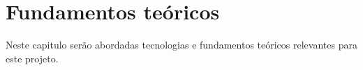 \chapter{Fundamentos teóricos}
\label{chap:theo}


Neste capitulo serão abordadas tecnologias e fundamentos teóricos relevantes para 
este projeto. \\


\begin{comment}

\section{Distribuições Linux}

Sendo Linux apenas um \textit{Kernel}, ou seja, um "nucleo" de um sistema operativo
o mesmo não pode ser usado si só da mesma forma que outros sistemas operativos.
Para ter um sistema completo é necessário adicionar multiplos programas/bibliotecas,
sendo assim, existe um numero elevado de sistemas operativos basedos em Linux.

Certas distribuições podem ter diferentes alvos de utilizadores/utilização, quer seja,
para uso pessoal/tradicional de um utilizar comum, quer seja para servidores.

As principais vantagens associadas ao uso de um Sistema operativo baseado em Linux são:
\begin{enumerate}
    \item Não é preciso licensa de utilização;
    \item Código aberto;
    \item É um sistema que por norma consome menos recursos que a maioria das distribuições disponiveis;
    \item costumização.
\end{enumerate} 



\section{Alpine Linux}

"Alpine Linux é uma distribuição Linux baseada em musl e BusyBox originalmente
projetada para utilizadores avançados que apreciam segurança, simplicidade e eficiência 
no uso de recursos." \cite{alpinewiki}

O Alpine Linux é uma distribuição independente, isto é, não baseda em nunhuma 
outra distribuição como muitas outras. E usada principalmente em ambientes
profissionais/servidores.


\end{comment}
